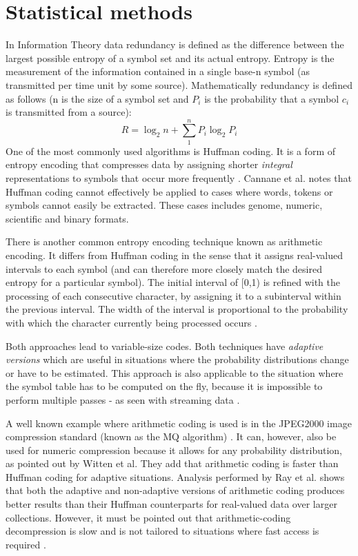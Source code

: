 \documentclass{acm_proc_article-sp}
\begin{document}
\section{Statistical methods}
In Information Theory data redundancy is defined as the difference between the largest possible entropy of a symbol set and its actual entropy. Entropy
is the measurement of the information contained in a single base-n symbol (as transmitted per time unit by some source). Mathematically redundancy is defined 
as follows (n is the size of a symbol set and $P_i$ is the probability that a symbol $c_i$ is transmitted from a source)\cite[p. 46 - 47]{salomon2004data}:
\begin{equation}
 R = \log_2n + \sum_1^nP_i\log_2P_i
\end{equation}
One of the most commonly used algorithms is Huffman coding. It is a form of entropy encoding that compresses data by assigning shorter \textit{integral} representations to symbols that 
occur more frequently \cite[ch 2]{salomon2004data}. Cannane et al. \cite{Cannane:2002:GCS:568727.568730} notes that Huffman coding cannot effectively be applied to cases where words, tokens 
or symbols cannot easily be extracted. These cases includes genome, numeric, scientific and binary formats. 

There is another common entropy encoding technique known as arithmetic encoding. It differs from Huffman coding in the sense that it assigns real-valued intervals to
each symbol (and can therefore more closely match the desired entropy for a particular symbol). The initial interval of [0,1) is refined with the processing of each consecutive character, 
by assigning it to a subinterval within the previous interval. The width of the interval is proportional to the probability with which the character currently being processed occurs \cite[ch 2]{salomon2004data}\cite{Witten:1987:ACD:214762.214771}. 

Both approaches lead to variable-size codes. Both techniques have \textit{adaptive versions} which are useful in situations where the probability distributions change or have to be 
estimated. This approach is also applicable to the situation where the symbol table has to be computed on the fly, because it is impossible to perform multiple passes - as seen with streaming data 
\cite[ch 2]{salomon2004data}\cite{ray1995database}.

A well known example where arithmetic coding is used is in the JPEG2000 image compression standard (known as the MQ algorithm) \cite{952804}. It can, however, also be used for 
numeric compression because it allows for any probability distribution, as pointed out by Witten et al. \cite{Witten:1987:ACD:214762.214771} They add that arithmetic coding is faster than Huffman coding for 
adaptive situations. Analysis performed by Ray et al. \cite{ray1995database} shows that both the adaptive and non-adaptive versions of arithmetic coding produces better 
results than their Huffman counterparts for real-valued data over larger collections. However, it must be pointed out that arithmetic-coding decompression is slow and is not tailored to 
situations where fast access is required \cite{williams1999compressing}.\\
\end{document}
